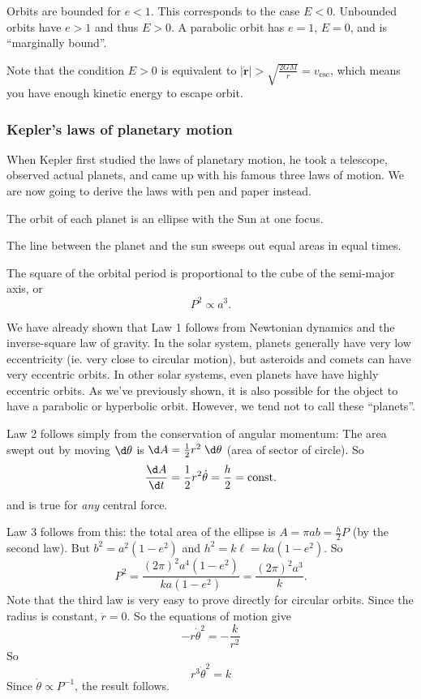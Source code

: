 \documentclass[a4paper]{article}
\begin{document}
Orbits are bounded for $e < 1$. This corresponds to the case $E < 0$. Unbounded orbits have $e > 1$ and thus $E > 0$. A parabolic orbit has $e = 1$, $E = 0$, and is ``marginally bound''.

Note that the condition $E > 0$ is equivalent to $|\dot{\mathbf{r}}| > \sqrt{\frac{2GM}{r}} = v_{\mathrm{esc}}$, which means you have enough kinetic energy to escape orbit.

\subsubsection*{Kepler's laws of planetary motion}
When Kepler first studied the laws of planetary motion, he took a telescope, observed actual planets, and came up with his famous three laws of motion. We are now going to derive the laws with pen and paper instead.

\begin{law}
  The orbit of each planet is an ellipse with the Sun at one focus.
\end{law}

\begin{law}
  The line between the planet and the sun sweeps out equal areas in equal times.
\end{law}

\begin{law}
  The square of the orbital period is proportional to the cube of the semi-major axis, or
  \[
    P^2 \propto a^3.
  \]
\end{law}

We have already shown that Law 1 follows from Newtonian dynamics and the inverse-square law of gravity. In the solar system, planets generally have very low eccentricity (ie. very close to circular motion), but asteroids and comets can have very eccentric orbits. In other solar systems, even planets have have highly eccentric orbits. As we've previously shown, it is also possible for the object to have a parabolic or hyperbolic orbit. However, we tend not to call these ``planets''.

Law 2 follows simply from the conservation of angular momentum: The area swept out by moving $\d \theta$ is $\d A = \frac{1}{2}r^2\;\d \theta$ (area of sector of circle). So
\[
  \frac{\d A}{\d t} = \frac{1}{2}r^2\dot{\theta} = \frac{h}{2} = \text{const}.
\]
and is true for \emph{any} central force.

Law 3 follows from this: the total area of the ellipse is $A = \pi ab = \frac{h}{2}P$ (by the second law). But $b^2 = a^2( 1 - e^2)$ and $h^2 = k\ell = ka(1 - e^2)$. So
\[
  P^2 = \frac{(2\pi)^2a^4(1 - e^2)}{ka(1 - e^2)} = \frac{(2\pi)^2 a^3}{k}.
\]
Note that the third law is very easy to prove directly for circular orbits. Since the radius is constant, $\ddot{r} = 0$. So the equations of motion give
\[
  -r \dot{\theta}^2 = -\frac{k}{r^2}
\]
So
\[
  r^3 \dot{\theta}^2 = k
\]
Since $\dot{\theta}\propto P^{-1}$, the result follows.
\end{document}
